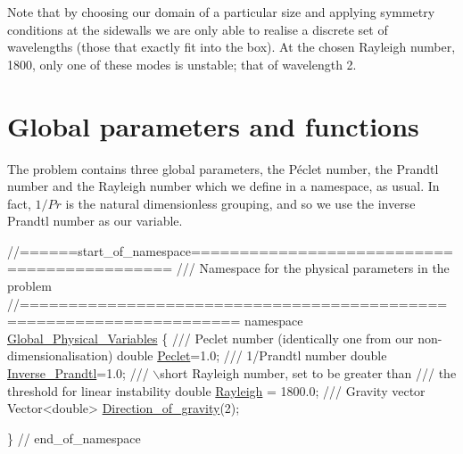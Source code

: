 Note that by choosing our domain of a particular size and applying symmetry conditions at the sidewalls we are only able to realise a discrete set of wavelengths (those that exactly fit into the box). At the chosen Rayleigh number, 1800, only one of these modes is unstable; that of wavelength 2.



 

\hypertarget{index_namespace}{}\section{Global parameters and functions}\label{index_namespace}
The problem contains three global parameters, the P\'{e}clet number, the Prandtl number and the Rayleigh number which we define in a namespace, as usual. In fact, $ 1/Pr $ is the natural dimensionless grouping, and so we use the inverse Prandtl number as our variable.  
\begin{DoxyCodeInclude}
\textcolor{comment}{//======start\_of\_namespace============================================}
\textcolor{comment}{/// Namespace for the physical parameters in the problem}
\textcolor{comment}{}\textcolor{comment}{//====================================================================}
\textcolor{keyword}{namespace }\hyperlink{namespaceGlobal__Physical__Variables}{Global\_Physical\_Variables}
\{\textcolor{comment}{}
\textcolor{comment}{ /// Peclet number (identically one from our non-dimensionalisation)}
\textcolor{comment}{} \textcolor{keywordtype}{double} \hyperlink{namespaceGlobal__Physical__Variables_ad4cdf142ba50635d62ac4c614f445af7}{Peclet}=1.0;
\textcolor{comment}{}
\textcolor{comment}{ /// 1/Prandtl number}
\textcolor{comment}{} \textcolor{keywordtype}{double} \hyperlink{namespaceGlobal__Physical__Variables_a87796c9f402e6f90c07cf5ba0db4367e}{Inverse\_Prandtl}=1.0;
\textcolor{comment}{}
\textcolor{comment}{ /// \(\backslash\)short Rayleigh number, set to be greater than }
\textcolor{comment}{ /// the threshold for linear instability}
\textcolor{comment}{} \textcolor{keywordtype}{double} \hyperlink{namespaceGlobal__Physical__Variables_a637fd2a6a7c5b34ed3288300d8bf84b7}{Rayleigh} = 1800.0;
\textcolor{comment}{}
\textcolor{comment}{ /// Gravity vector}
\textcolor{comment}{} Vector<double> \hyperlink{namespaceGlobal__Physical__Variables_a42f4a0aee37dbb36186267931c614053}{Direction\_of\_gravity}(2);
  
\} \textcolor{comment}{// end\_of\_namespace}

\end{DoxyCodeInclude}





